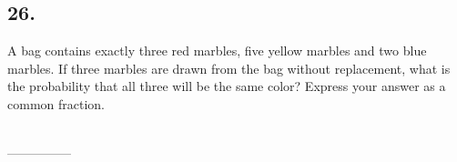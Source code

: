 \documentclass[12pt]{article}
\begin{document}
\begin{answer}
%
\end{answer}


\subsection*{26.}
A bag contains exactly three red marbles, five yellow marbles and two blue marbles. If three marbles are drawn from the bag without replacement, what is the probability that all three will be the same color? Express your answer as a common fraction.

\fbox{\phantom{ANSWER}}\\
\mbox{---------------}\\
\fbox{\phantom{ANSWER}}
\end{document}

